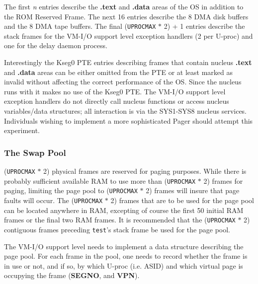 The first \emph{n} entries describe the \textbf{.text} and \textbf{.data} areas of the OS in addition to the ROM Reserved Frame. 
The next 16 entries describe the 8 DMA disk buffers and the 8 DMA tape buffers. 
The final (\verb+UPROCMAX+ $*$ 2) + 1 entries describe the stack frames for the VM-I/O support level exception handlers (2 per U-proc) and one for the delay daemon process.

Interestingly the Kseg0 PTE entries describing frames that contain nucleus \textbf{.text} and \textbf{.data} areas can be either omitted from the PTE or at least marked as invalid without affecting the correct performance of the OS. 
Since the nucleus runs with \vmoff{} it makes no use of the Kseg0 PTE. 
The VM-I/O support level exception handlers do not directly call nucleus functions or access nucleus variables/data structures; all interaction is via the SYS1-SYS8 nucleus services.
Individuals wishing to implement a more sophisticated Pager should attempt this experiment.


\subsubsection{The Swap Pool}
(\verb+UPROCMAX+ $*$ 2) physical frames are reserved for paging purposes. 
While there is probably sufficient available RAM to use more than (\verb+UPROCMAX+ $*$ 2) frames for paging, limiting the page pool to (\verb+UPROCMAX+ $*$ 2) frames will insure that page faults will occur. 
The (\verb+UPROCMAX+ $*$ 2) frames that are to be used for the page pool can be located anywhere in RAM, excepting of course the first 50 initial RAM frames or the final two RAM frames. 
It is recommended that the (\verb+UPROCMAX+ $*$ 2) contiguous frames preceding \verb+test+'s stack frame be used for the page pool.

The VM-I/O support level needs to implement a data structure describing the page pool. 
For each frame in the pool, one needs to record whether the frame is in use or not, and if so, by which U-proc (i.e. ASID) and which virtual page is occupying the frame (\textbf{SEGNO}, and \textbf{VPN}).


